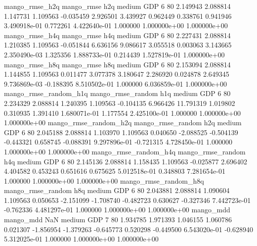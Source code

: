        mango_rmse_h2q        mango_rmse                  h2q     medium      GDP                 6 80  2.149943       2.088814 1.147731       1.109563   -0.035459      2.926501      3.439927     0.962449       0.338761  0.941946 3.490918e-01     0.772261   4.422640e-01            1.000000    1.000000e+00        1.000000e+00
       mango_rmse_h4q        mango_rmse                  h4q     medium      GDP                 6 80  2.227431       2.088814 1.210385       1.109563   -0.051844      6.636156      9.086617     3.055518       0.003063  3.143665 2.350490e-03     1.325356   1.888733e-01            0.214439    1.527819e-01        1.000000e+00
       mango_rmse_h8q        mango_rmse                  h8q     medium      GDP                 6 80  2.153094       2.088814 1.144855       1.109563    0.011477      3.077378      3.180647     2.286920       0.024878  2.649345 9.736869e-03    -0.188395   8.510502e-01            1.000000    6.036859e-01        1.000000e+00
mango_rmse_random_h1q mango_rmse_random                  h1q     medium      GDP                 6 80  2.234329       2.088814 1.240395       1.109563   -0.104135      6.966426     11.791319     1.019802       0.310935  1.391410 1.680071e-01     1.177554   2.425100e-01            1.000000    1.000000e+00        1.000000e+00
mango_rmse_random_h2q mango_rmse_random                  h2q     medium      GDP                 6 80  2.045188       2.088814 1.103970       1.109563    0.040650     -2.088525     -0.504139    -0.443321       0.658745 -0.088391 9.297896e-01    -0.721315   4.728450e-01            1.000000    1.000000e+00        1.000000e+00
mango_rmse_random_h4q mango_rmse_random                  h4q     medium      GDP                 6 80  2.145136       2.088814 1.158435       1.109563   -0.025877      2.696402      4.404582     0.453243       0.651616  0.675625 5.012518e-01     0.348803   7.281654e-01            1.000000    1.000000e+00        1.000000e+00
mango_rmse_random_h8q mango_rmse_random                  h8q     medium      GDP                 6 80  2.043881       2.088814 1.090604       1.109563    0.050653     -2.151099     -1.708740    -0.482723       0.630627 -0.327346 7.442723e-01    -0.762336   4.481297e-01            1.000000    1.000000e+00        1.000000e+00
            mango_mdd         mango_mdd                  NaN     medium      GDP                 7 80  1.934785       1.971393 1.046155       1.060786    0.021307     -1.856954     -1.379263    -0.645773       0.520298 -0.449500 6.543020e-01    -0.628940   5.312025e-01            1.000000    1.000000e+00        1.000000e+00
